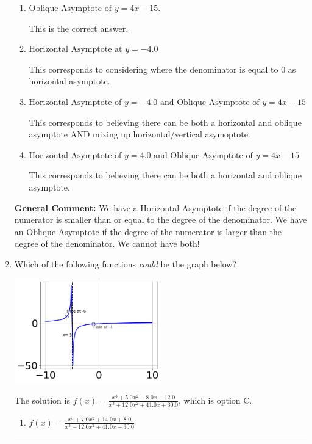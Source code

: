 \documentclass{extbook}[14pt]
\newcommand{\litem}[1]{\item #1

\rule{\textwidth}{0.4pt}}
\begin{document}
\begin{enumerate}
{\begin{enumerate}[label=\Alph*.]
This corresponds to using rule for Horizontal Asymptote when degree of numerator and denominator match.
\item \( \text{Oblique Asymptote of } y = 4x -15. \)

This is the correct answer.
\item \( \text{Horizontal Asymptote at } y = -4.0 \)

This corresponds to considering where the denominator is equal to 0 as horizontal asymptote.
\item \( \text{Horizontal Asymptote of } y = -4.0 \text{ and Oblique Asymptote of } y = 4x -15 \)

This corresponds to believing there can be both a horizontal and oblique asymptote AND mixing up horizontal/vertical asymoptote.
\item \( \text{Horizontal Asymptote of } y = 4.0 \text{ and Oblique Asymptote of } y = 4x -15 \)

This corresponds to believing there can be both a horizontal and oblique asymptote.
\end{enumerate}

\textbf{General Comment:} We have a Horizontal Asymptote if the degree of the numerator is smaller than or equal to the degree of the denominator. We have an Oblique Asymptote if the degree of the numerator is larger than the degree of the denominator. We cannot have both!
}
\litem{
Which of the following functions \textit{could} be the graph below?

\begin{center}
    \includegraphics[width=0.5\textwidth]{../Figures/identifyGraphOfRationalFunctionC.png}
\end{center}


The solution is \( f(x)=\frac{x^{3} +5.0 x^{2} -8.0 x -12.0}{x^{3} +12.0 x^{2} +41.0 x + 30.0} \), which is option C.\begin{enumerate}[label=\Alph*.]
\item \( f(x)=\frac{x^{3} +7.0 x^{2} +14.0 x + 8.0}{x^{3} -12.0 x^{2} +41.0 x -30.0} \)


\end{enumerate}}
\end{enumerate}
\end{document}
